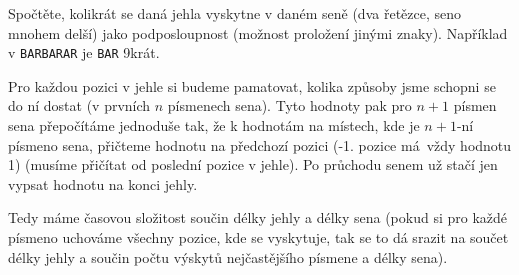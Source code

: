 \documentclass[12pt]{article}                   %
\begin{document}
\begin{priklad}[podposloupnost]
	Spočtěte, kolikrát se daná jehla vyskytne v daném seně (dva řetězce, seno mnohem delší) jako podposloupnost (možnost proložení jinými znaky). Například v \verb|BARBARAR| je \verb|BAR| 9krát. 

	\begin{reseni}
		Pro každou pozici v jehle si budeme pamatovat, kolika způsoby jsme schopni se do ní dostat (v prvních $n$ písmenech sena). Tyto hodnoty pak pro $n+1$ písmen sena přepočítáme jednoduše tak, že k hodnotám na místech, kde je $n+1$-ní písmeno sena, přičteme hodnotu na předchozí pozici (-1. pozice má vždy hodnotu 1) (musíme přičítat od poslední pozice v jehle). Po průchodu senem už stačí jen vypsat hodnotu na konci jehly.

		Tedy máme časovou složitost součin délky jehly a délky sena (pokud si pro každé písmeno uchováme všechny pozice, kde se vyskytuje, tak se to dá srazit na součet délky jehly a součin počtu výskytů nejčastějšího písmene a délky sena).
	\end{reseni}
\end{priklad}
\end{document}
